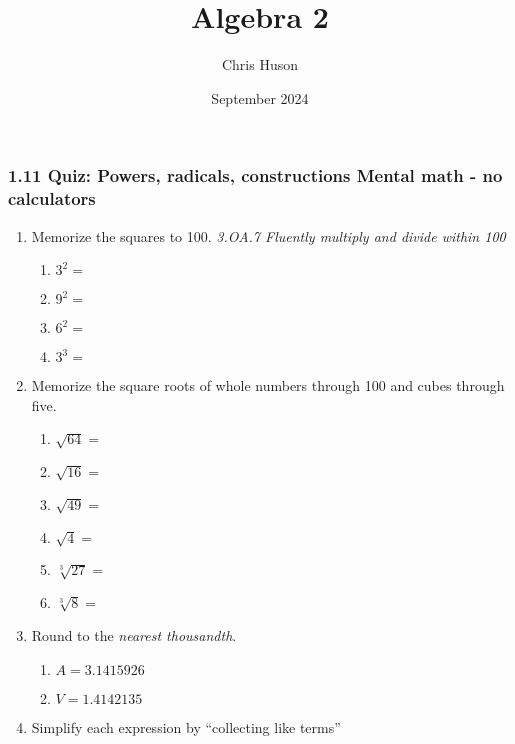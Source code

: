 \documentclass[12pt, twoside]{article}
\title{Algebra 2}
\author{Chris Huson}
\date{September 2024}
\begin{document}
\subsubsection*{1.11 Quiz: Powers, radicals, constructions \hfill Mental math - no calculators}
\begin{enumerate}[itemsep=0.5cm]

  \item Memorize the squares to 100. \hfill \emph{3.OA.7 Fluently multiply and divide within 100}
  \begin{multicols}{2}
      \begin{enumerate}[itemsep=0.5cm]
          \item $3^2 =$
          \item $9^2 =$
          \item $6^2 =$
          \item $3^3 =$
      \end{enumerate}
  \end{multicols}

\item Memorize the square roots of whole numbers through 100 and cubes through five.
  \begin{multicols}{2}
      \begin{enumerate}[itemsep=0.5cm]
          \item $\sqrt{64} =$
          \item $\sqrt{16} =$
          \item $\sqrt{49} =$
          \item $\sqrt{4} =$
          \item $\sqrt[3]{27} =$
          \item $\sqrt[3]{8} =$
        \end{enumerate}
  \end{multicols}

\item Round to the \emph{nearest thousandth}.
  \begin{multicols}{2}
  \begin{enumerate}[itemsep=1.5cm]
    \item $A=3.1415926$
    \item $V=1.4142135$
  \end{enumerate}
  \end{multicols} \vspace{0.5cm}

\item Simplify each expression by ``collecting like terms''
\begin{enumerate}[itemsep=2cm]
  \end{enumerate} \vspace{1cm}


\end{enumerate}
\end{document}
